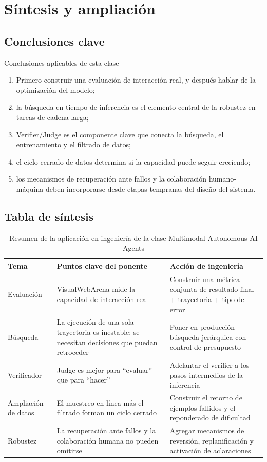 \section{Síntesis y ampliación}

\subsection{Conclusiones clave}
\begin{importantbox}{Conclusiones aplicables de esta clase}
\begin{enumerate}
    \item Primero construir una evaluación de interacción real, y después hablar de la optimización del modelo;
    \item la búsqueda en tiempo de inferencia es el elemento central de la robustez en tareas de cadena larga;
    \item Verifier/Judge es el componente clave que conecta la búsqueda, el entrenamiento y el filtrado de datos;
    \item el ciclo cerrado de datos determina si la capacidad puede seguir creciendo;
    \item los mecanismos de recuperación ante fallos y la colaboración humano-máquina deben incorporarse desde etapas tempranas del diseño del sistema.
\end{enumerate}
\end{importantbox}

\subsection{Tabla de síntesis}
\begin{table}[H]
\centering
\small
\begin{tabular}{p{2.6cm}p{3.9cm}p{4.3cm}}
\toprule
\textbf{Tema} & \textbf{Puntos clave del ponente} & \textbf{Acción de ingeniería} \\
\midrule
Evaluación & VisualWebArena mide la capacidad de interacción real & Construir una métrica conjunta de resultado final + trayectoria + tipo de error \\
Búsqueda & La ejecución de una sola trayectoria es inestable; se necesitan decisiones que puedan retroceder & Poner en producción búsqueda jerárquica con control de presupuesto \\
Verificador & Judge es mejor para ``evaluar'' que para ``hacer'' & Adelantar el verifier a los pasos intermedios de la inferencia \\
Ampliación de datos & El muestreo en línea más el filtrado forman un ciclo cerrado & Construir el retorno de ejemplos fallidos y el reponderado de dificultad \\
Robustez & La recuperación ante fallos y la colaboración humana no pueden omitirse & Agregar mecanismos de reversión, replanificación y activación de aclaraciones \\
\bottomrule
\end{tabular}
\caption{Resumen de la aplicación en ingeniería de la clase Multimodal Autonomous AI Agents}
\end{table}

